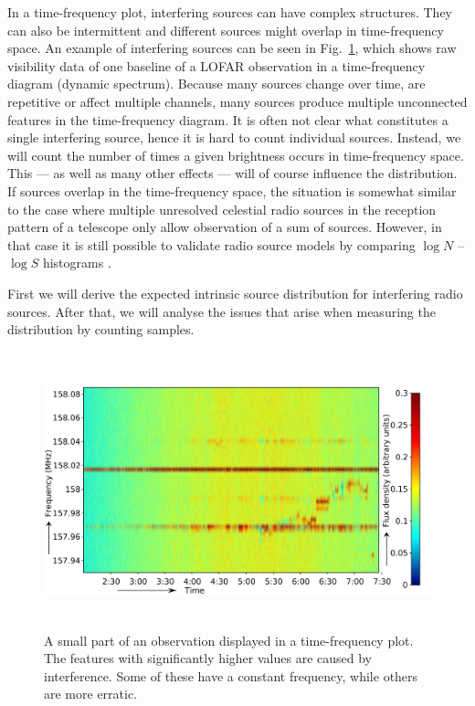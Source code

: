 \documentclass[useAMS,usenatbib]{mn2e}
\begin{document}
In a time-frequency plot, interfering sources can have complex structures. They can also be intermittent and different sources might overlap in time-frequency space. An example of interfering sources can be seen in Fig.~\ref{fig:dist-rfi-example}, which shows raw visibility data of one baseline of a LOFAR observation in a time-frequency diagram (dynamic spectrum). Because many sources change over time, are repetitive or affect multiple channels, many sources produce multiple unconnected features in the time-frequency diagram. It is often not clear what constitutes a single interfering source, hence it is hard to count individual sources. Instead, we will count the number of times a given brightness occurs in time-frequency space. This --- as well as many other effects --- will of course influence the distribution. If sources overlap in the time-frequency space, the situation is somewhat similar to the case where multiple unresolved celestial radio sources in the reception pattern of a telescope only allow observation of a sum of sources. However, in that case it is still possible to validate radio source models by comparing $\log N$ -- $\log S$ histograms \citep{scheuer-analysing-faint-stars}.

First we will derive the expected intrinsic source distribution for interfering radio sources. After that, we will analyse the issues that arise when measuring the distribution by counting samples.

\begin{figure}
\begin{center}
\includegraphics[height=8cm]{img/TF-L43786_L220-rfi-example.pdf}
\caption{A small part of an observation displayed in a time-frequency plot. The features with significantly higher values are caused by interference. Some of these have a constant frequency, while others are more erratic.}
\label{fig:dist-rfi-example}
\end{center}
\end{figure}
\end{document}
